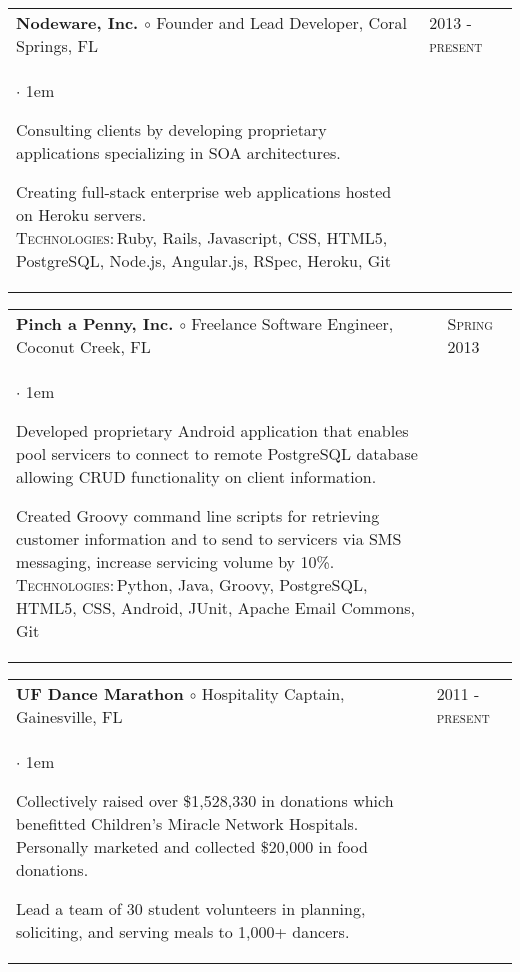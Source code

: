 \documentclass[11pt]{article}
\makeatletter
\newcommand{\employer}[4]
	{{ \begin{tabular}{l@{\hspace{5mm}}|p{30mm}}
	   \multicolumn{1}{l}{\textbf{#1 $\circ$ }#2}&\multicolumn{1}{p{30mm}}{\hspace{-3mm}\textsc{#3}} \\
	   \parbox{.825\textwidth}{#4 \vspace*{-4pt}}
	   \end{tabular} \vspace{4pt} }}
\newenvironment{achievements}           %
	{\begin{list}{$\cdot$}{\topsep 0pt \itemsep 4pt \parsep 0pt \leftmargin 1em}
	 \linespread{1.05} \selectfont %
	}
	{\end{list}\vspace*{4pt}}
\def\kt{\vspace*{2pt}\\\textsc{Technologies:\,}}
\makeatother
\begin{document}
\employer{Nodeware, Inc.}{Founder and Lead Developer, Coral Springs, FL}{2013 - present}{
\begin{achievements}

\item{Consulting clients by developing proprietary applications specializing in SOA architectures.}

\item{Creating full-stack enterprise web applications hosted on Heroku servers. \kt Ruby, Rails, Javascript, CSS, HTML5, PostgreSQL, Node.js, Angular.js, RSpec, Heroku, Git}

\end{achievements} 
}


\employer{Pinch a Penny, Inc.}{Freelance Software Engineer, Coconut Creek, FL}{Spring 2013}{
	\begin{achievements}
	
	\item{Developed proprietary Android application that enables pool servicers to connect to remote PostgreSQL database allowing CRUD functionality on client information.}
	
	\item{Created Groovy command line scripts for retrieving customer information and to send to servicers via SMS messaging, increase servicing volume by 10\%.  \kt Python, Java, Groovy, PostgreSQL, HTML5, CSS, Android, JUnit, Apache Email Commons, Git}
	
	\end{achievements}
}

\employer{UF Dance Marathon}{Hospitality Captain, Gainesville, FL}{2011 - present} {
	\begin{achievements}
	
	\item{Collectively raised over \$1,528,330 in donations which benefitted Children’s Miracle Network Hospitals. Personally marketed and collected \$20,000 in food donations.}
	\item{Lead a team of 30 student volunteers in planning, soliciting, and serving meals to 1,000+ dancers. }

	\end{achievements}
}
\end{document}
